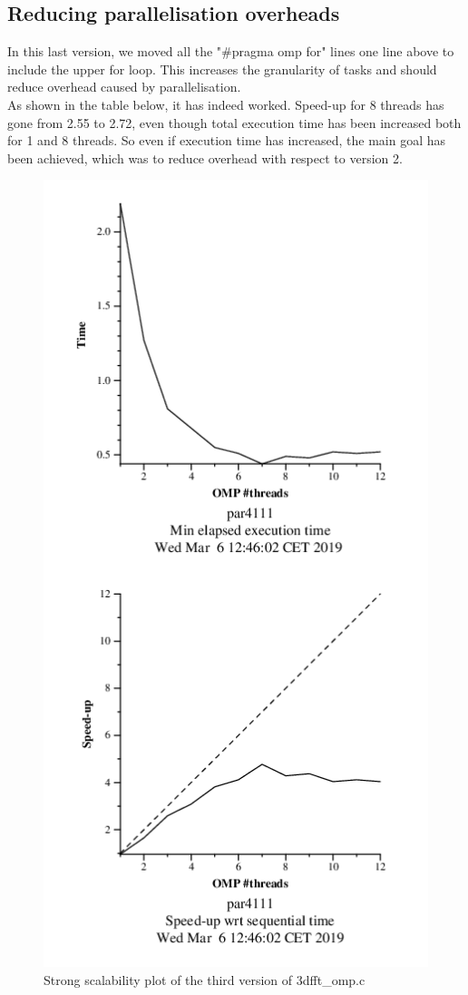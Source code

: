 \documentclass[12]{article}
\begin{document}
\subsection{Reducing parallelisation overheads}
In this last version, we moved all the "\#pragma omp for" lines one line above to include the upper for loop. This increases the granularity of tasks and should reduce overhead caused by parallelisation. \\
As shown in the table below, it has indeed worked. Speed-up for 8 threads has gone from 2.55 to 2.72, even though total execution time has been increased both for 1 and 8 threads. So even if execution time has increased, the main goal has been achieved, which was to reduce overhead with respect to version 2.

\begin{figure}[H]
\centering  
\includegraphics[scale=0.5]{images/megaImproved_3dfft/strongPlot.PNG}
  \caption{Strong scalability plot of the third version of 3dfft\_omp.c}
  \label{fig:imp23ddftStrongPlot}
\end{figure}
\end{document}
